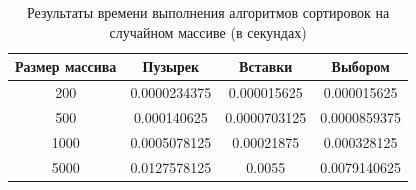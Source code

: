 \documentclass[14pt,russian]{scrartcl}
\begin{document}
    \begin{table}[htb]
        \caption{\centering Результаты времени выполнения алгоритмов сортировок на случайном массиве (в секундах)}
        \centering
        \begin{tabular}{|c|c|c|c|}
        \hline
        Размер массива & Пузырек  & Вставки  & Выбором  \\ \hline
        200             & 0.0000234375 & 0.000015625 & 0.000015625 \\ \hline
        500            & 0.000140625 & 0.0000703125 & 0.0000859375 \\ \hline
        1000            & 0.0005078125 & 0.00021875 & 0.000328125 \\ \hline
        5000           & 0.0127578125 & 0.0055 & 0.0079140625 \\ \hline
        \end{tabular}
        \label{tab:rand_bench}
    \end{table}
\end{document}
